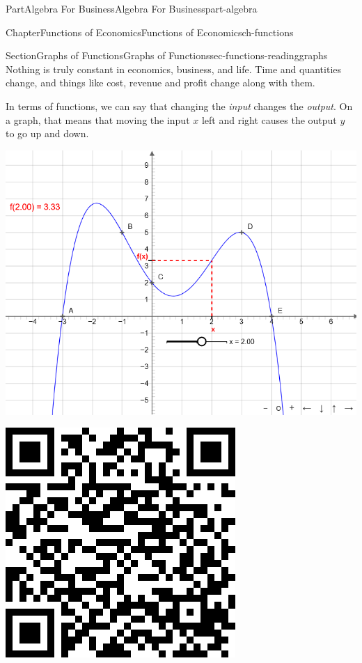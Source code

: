 \documentclass{tufte-book}
\numberwithin{equation}{chapter}
\begin{document}
\begin{partptx}{Part}{Algebra For Business}{}{Algebra For Business}{}{}{part-algebra}
\begin{chapterptx}{Chapter}{Functions of Economics}{}{Functions of Economics}{}{}{ch-functions}
\begin{sectionptx}{Section}{Graphs of Functions}{}{Graphs of Functions}{}{}{sec-functions-readinggraphs}
Nothing is truly constant in economics, business, and life. Time and quantities change, and things like cost, revenue and profit change along with them.%
\par
In terms of functions, we can say that changing the \emph{input}  changes the \emph{output}. On a graph, that means that moving the input \(x\) left and right causes the output \(y\) to go up and down.%
\begin{sidebyside}{2}{0.075}{0.075}{0.17}%
\begin{sbspanel}{0.47}%
\includegraphics[width=\linewidth]{external/jsxgraph-algebra-function-notation.png}
\end{sbspanel}%
\begin{sbspanel}{0.21}%
\includegraphics[width=\linewidth]{generated/qrcode/sec-functions-readinggraphs-4.png}

\end{sbspanel}
\end{sidebyside}
\end{sectionptx}
\end{chapterptx}
\end{partptx}
\end{document}
